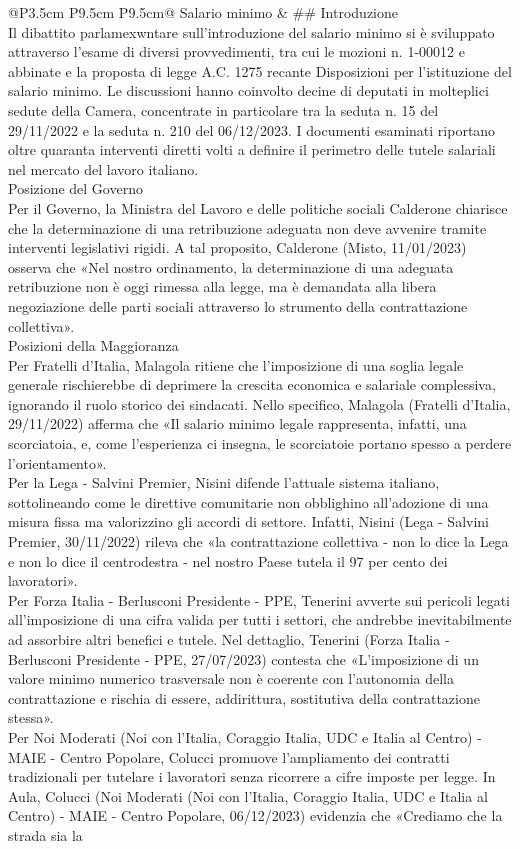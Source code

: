 \documentclass[a4paper,11pt]{article}
\begin{document}
\begin{landscape}
\begin{longtable}{@{}P{3.5cm} P{9.5cm} P{9.5cm}@{}}
Salario minimo & \#\# Introduzione\\[6pt] Il dibattito parlamexwntare sull'introduzione del salario minimo si è sviluppato attraverso l'esame di diversi provvedimenti, tra cui le mozioni n. 1-00012 e abbinate e la proposta di legge A.C. 1275 recante Disposizioni per l'istituzione del salario minimo. Le discussioni hanno coinvolto decine di deputati in molteplici sedute della Camera, concentrate in particolare tra la seduta n. 15 del 29/11/2022 e la seduta n. 210 del 06/12/2023. I documenti esaminati riportano oltre quaranta interventi diretti volti a definire il perimetro delle tutele salariali nel mercato del lavoro italiano.\\[6pt] Posizione del Governo\\[6pt] Per il Governo, la Ministra del Lavoro e delle politiche sociali Calderone chiarisce che la determinazione di una retribuzione adeguata non deve avvenire tramite interventi legislativi rigidi. A tal proposito, Calderone (Misto, 11/01/2023) osserva che «Nel nostro ordinamento, la determinazione di una adeguata retribuzione non è oggi rimessa alla legge, ma è demandata alla libera negoziazione delle parti sociali attraverso lo strumento della contrattazione collettiva».\\[6pt] Posizioni della Maggioranza\\[6pt] Per Fratelli d'Italia, Malagola ritiene che l'imposizione di una soglia legale generale rischierebbe di deprimere la crescita economica e salariale complessiva, ignorando il ruolo storico dei sindacati. Nello specifico, Malagola (Fratelli d'Italia, 29/11/2022) afferma che «Il salario minimo legale rappresenta, infatti, una scorciatoia, e, come l'esperienza ci insegna, le scorciatoie portano spesso a perdere l'orientamento».\\[6pt] Per la Lega - Salvini Premier, Nisini difende l'attuale sistema italiano, sottolineando come le direttive comunitarie non obblighino all'adozione di una misura fissa ma valorizzino gli accordi di settore. Infatti, Nisini (Lega - Salvini Premier, 30/11/2022) rileva che «la contrattazione collettiva - non lo dice la Lega e non lo dice il centrodestra - nel nostro Paese tutela il 97 per cento dei lavoratori».\\[6pt] Per Forza Italia - Berlusconi Presidente - PPE, Tenerini avverte sui pericoli legati all'imposizione di una cifra valida per tutti i settori, che andrebbe inevitabilmente ad assorbire altri benefici e tutele. Nel dettaglio, Tenerini (Forza Italia - Berlusconi Presidente - PPE, 27/07/2023) contesta che «L'imposizione di un valore minimo numerico trasversale non è coerente con l'autonomia della contrattazione e rischia di essere, addirittura, sostitutiva della contrattazione stessa».\\[6pt] Per Noi Moderati (Noi con l'Italia, Coraggio Italia, UDC e Italia al Centro) - MAIE - Centro Popolare, Colucci promuove l'ampliamento dei contratti tradizionali per tutelare i lavoratori senza ricorrere a cifre imposte per legge. In Aula, Colucci (Noi Moderati (Noi con l'Italia, Coraggio Italia, UDC e Italia al Centro) - MAIE - Centro Popolare, 06/12/2023) evidenzia che «Crediamo che la strada sia la 
\end{longtable}
\end{landscape}
\end{document}
